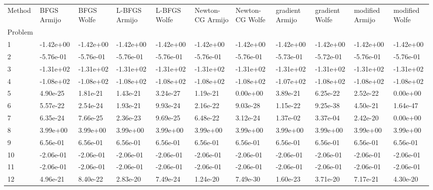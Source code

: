 \begin{tabular}{lllllllllll}
\toprule
Method & BFGS Armijo & BFGS Wolfe & L-BFGS Armijo & L-BFGS Wolfe & Newton-CG Armijo & Newton-CG Wolfe & gradient Armijo & gradient Wolfe & modified Armijo & modified Wolfe \\
Problem &             &            &               &              &                  &                 &                 &                &                 &                \\
\midrule
1       &   -1.42e+00 &  -1.42e+00 &     -1.42e+00 &    -1.42e+00 &        -1.42e+00 &       -1.42e+00 &       -1.42e+00 &      -1.42e+00 &       -1.42e+00 &      -1.42e+00 \\
2       &   -5.76e-01 &  -5.76e-01 &     -5.76e-01 &    -5.76e-01 &        -5.76e-01 &       -5.76e-01 &       -5.73e-01 &      -5.72e-01 &       -5.76e-01 &      -5.76e-01 \\
3       &   -1.31e+02 &  -1.31e+02 &     -1.31e+02 &    -1.31e+02 &        -1.31e+02 &       -1.31e+02 &       -1.31e+02 &      -1.31e+02 &       -1.31e+02 &      -1.31e+02 \\
4       &   -1.08e+02 &  -1.08e+02 &     -1.08e+02 &    -1.08e+02 &        -1.08e+02 &       -1.08e+02 &       -1.07e+02 &      -1.08e+02 &       -1.08e+02 &      -1.08e+02 \\
5       &    4.90e-25 &   1.81e-21 &      1.43e-21 &     3.24e-27 &         1.19e-21 &        0.00e+00 &        3.89e-21 &       6.25e-22 &        2.52e-22 &       0.00e+00 \\
6       &    5.57e-22 &   2.54e-24 &      1.93e-21 &     9.93e-24 &         2.16e-22 &        9.03e-28 &        1.15e-22 &       9.25e-38 &        4.50e-21 &       1.64e-47 \\
7       &    6.35e-24 &   7.66e-25 &      2.36e-23 &     9.69e-25 &         6.48e-22 &        3.12e-24 &        1.37e-02 &       3.37e-04 &        2.42e-20 &       0.00e+00 \\
8       &    3.99e+00 &   3.99e+00 &      3.99e+00 &     3.99e+00 &         3.99e+00 &        3.99e+00 &        3.99e+00 &       3.99e+00 &        3.99e+00 &       3.99e+00 \\
9       &    6.56e-01 &   6.56e-01 &      6.56e-01 &     6.56e-01 &         6.56e-01 &        6.56e-01 &        6.56e-01 &       6.56e-01 &        6.56e-01 &       6.56e-01 \\
10      &   -2.06e-01 &  -2.06e-01 &     -2.06e-01 &    -2.06e-01 &        -2.06e-01 &       -2.06e-01 &       -2.06e-01 &      -2.06e-01 &       -2.06e-01 &      -2.06e-01 \\
11      &   -2.06e-01 &  -2.06e-01 &     -2.06e-01 &    -2.06e-01 &        -2.06e-01 &       -2.06e-01 &       -2.06e-01 &      -2.06e-01 &       -2.06e-01 &      -2.06e-01 \\
12      &    4.96e-21 &   8.40e-22 &      2.83e-20 &     7.49e-24 &         1.24e-20 &        7.49e-30 &        1.60e-23 &       3.71e-20 &        7.17e-21 &       4.30e-20 \\
\bottomrule
\end{tabular}
